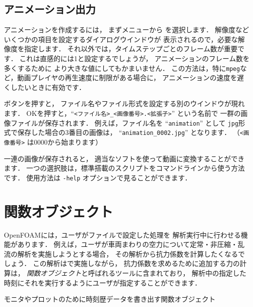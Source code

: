 \subsection{アニメーション出力}
\label{ssec:6.1.10}
アニメーションを作成するには，
まずメニューから
%
%
を選択します．
解像度などいくつかの項目を設定するダイアログウインドウが
表示されるので，必要な解像度を指定します．
それ以外では，タイムステップごとのフレーム数が重要です．
これは直感的には1と設定するでしょうが，
アニメーションのフレーム数を多くするために
より大きな値にしてもかまいません．
この方法は，特に\texttt{mpeg}など，動画プレイヤの再生速度に制限がある場合に，
アニメーションの速度を遅くしたいときに有効です．

ボタンを押すと，
ファイル名やファイル形式を設定する別のウインドウが現れます．
OKを押すと，``\verb|<ファイル名>_<画像番号>.<拡張子>|'' という名前で
一群の画像ファイルが保存されます．
例えば，ファイル名を ``\verb|animation|'' として
\texttt{jpg}形式で保存した場合の3番目の画像は，
``\verb|animation_0002.jpg|'' となります．
（\verb|<画像番号>| は0000から始まります）

一連の画像が保存されると，
適当なソフトを使って動画に変換することができます．
一つの選択肢は，標準搭載のスクリプトをコマンドラインから使う方法です．
使用方法は \verb|-help| オプションで見ることができます．



\section{関数オブジェクト}
\label{sec:6.2@3.0.1}
OpenFOAMには，ユーザがファイルで設定した処理を
解析実行中に行わせる機能があります．
例えば，ユーザが車両まわりの空力について定常・非圧縮・乱流の解析を実施しようとする場合，
その解析から抗力係数を計算したくなるでしょう．
この解析はで実施しながら，
抗力係数を求めるために追加する力の計算は，
\emph{関数オブジェクト}と呼ばれるツールに含まれており，
解析中の指定した時刻にそれを実行するようにユーザが指定することができます．


\begin{table}[ht]
 
 \caption{モニタやプロットのために時刻歴データを書き出す関数オブジェクト}
 \label{tbl:6.1@3.0.1}
\end{table}


